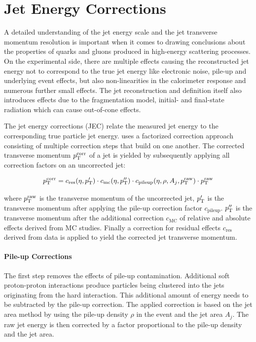 \section{Jet Energy Corrections}
\label{sec:jec}

A detailed understanding of the jet energy scale and the jet transverse momentum
resolution is important when it comes to drawing conclusions about the
properties of quarks and gluons produced in high-energy scattering processes. On the
experimental side, there are multiple effects causing the reconstructed jet
energy not to correspond to the true jet energy like electronic noise, pile-up
and underlying event effects, but also non-linearities in the calorimeter
response and numerous further small effects. The jet reconstruction and
definition itself also introduces effects due to the fragmentation model,
initial- and final-state radiation which can cause out-of-cone effects.

The jet energy corrections (JEC) relate the measured jet energy to the
corresponding true particle jet energy. \CMS uses a factorized correction approach
consisting of multiple correction steps that build on one another. The corrected
transverse momentum $p_{\mathrm{T}}^{\mathrm{corr}}$ of a jet is yielded by subsequently applying all correction
factors on an uncorrected jet:

\begin{equation*}
    p_{\mathrm{T}}^{\mathrm{corr}} = c_{\mathrm{res}} (\eta, p_{\mathrm{T}}^{\prime}) \cdot c_{\mathrm{mc}}
    (\eta, p_{\mathrm{T}}^{\prime\prime}) \cdot c_{\mathrm{pileup}}(\eta, \rho, A_j, p_{\mathrm{T}}^{\mathrm{raw}}) \cdot p_{\mathrm{T}}^{\mathrm{raw}} 
\end{equation*}

where $p_{\mathrm{T}}^{\mathrm{raw}}$ is the transverse momentum of the uncorrected jet,
$p_{\mathrm{T}}^{\prime}$ is the transverse momentum after applying the pile-up correction
factor $c_{\mathrm{pileup}}$. $p_{\mathrm{T}}^{\prime\prime}$ is the transverse momentum
after the additional correction $c_\mathrm{MC}$ of relative and absolute effects
derived from MC studies. Finally a correction for residual effects
$c_{\mathrm{res}}$ derived from data is applied to yield the corrected jet
transverse momentum.

\paragraph{Pile-up Corrections}
\label{pileup_correction}

The first step removes the effects of pile-up contamination. Additional soft
proton-proton interactions produce particles being clustered into the jets
originating from the hard interaction. This additional amount of energy needs to
be subtracted by the pile-up correction. The applied correction is based on the
jet area method by using the pile-up density $\rho$ in the event and the jet
area $A_j$. The raw jet energy is then corrected by a factor proportional to the
pile-up density and the jet area.

